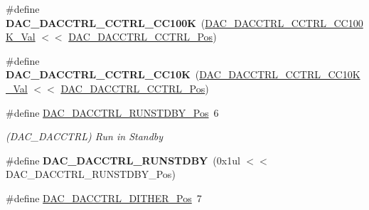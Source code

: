 \begin{DoxyCompactItemize}
\item 
\hypertarget{group___s_a_m_l21___d_a_c_gab7ebf1c9eaad10a93d17ce83471472a4}{}\#define {\bfseries D\+A\+C\+\_\+\+D\+A\+C\+C\+T\+R\+L\+\_\+\+C\+C\+T\+R\+L\+\_\+\+C\+C100\+K}~(\hyperlink{group___s_a_m_l21___d_a_c_ga64aa7d99ee21bf0fcc63c55df258a865}{D\+A\+C\+\_\+\+D\+A\+C\+C\+T\+R\+L\+\_\+\+C\+C\+T\+R\+L\+\_\+\+C\+C100\+K\+\_\+\+Val}  $<$$<$ \hyperlink{group___s_a_m_l21___d_a_c_ga99c14926d2b1e10dcdf3495435242fb2}{D\+A\+C\+\_\+\+D\+A\+C\+C\+T\+R\+L\+\_\+\+C\+C\+T\+R\+L\+\_\+\+Pos})\label{group___s_a_m_l21___d_a_c_gab7ebf1c9eaad10a93d17ce83471472a4}

\item 
\hypertarget{group___s_a_m_l21___d_a_c_gad902d7c36f9dbea0fc5b9163c98545ca}{}\#define {\bfseries D\+A\+C\+\_\+\+D\+A\+C\+C\+T\+R\+L\+\_\+\+C\+C\+T\+R\+L\+\_\+\+C\+C10\+K}~(\hyperlink{group___s_a_m_l21___d_a_c_gaa2391a15778507e58f38981575433508}{D\+A\+C\+\_\+\+D\+A\+C\+C\+T\+R\+L\+\_\+\+C\+C\+T\+R\+L\+\_\+\+C\+C10\+K\+\_\+\+Val}   $<$$<$ \hyperlink{group___s_a_m_l21___d_a_c_ga99c14926d2b1e10dcdf3495435242fb2}{D\+A\+C\+\_\+\+D\+A\+C\+C\+T\+R\+L\+\_\+\+C\+C\+T\+R\+L\+\_\+\+Pos})\label{group___s_a_m_l21___d_a_c_gad902d7c36f9dbea0fc5b9163c98545ca}

\item 
\hypertarget{group___s_a_m_l21___d_a_c_gaf3ba0076e55be71014f13602c7e9de14}{}\#define \hyperlink{group___s_a_m_l21___d_a_c_gaf3ba0076e55be71014f13602c7e9de14}{D\+A\+C\+\_\+\+D\+A\+C\+C\+T\+R\+L\+\_\+\+R\+U\+N\+S\+T\+D\+B\+Y\+\_\+\+Pos}~6\label{group___s_a_m_l21___d_a_c_gaf3ba0076e55be71014f13602c7e9de14}

\begin{DoxyCompactList}\small\item\em (D\+A\+C\+\_\+\+D\+A\+C\+C\+T\+R\+L) Run in Standby \end{DoxyCompactList}\item 
\hypertarget{group___s_a_m_l21___d_a_c_gab4a6d29fd16a3ce31665c3298e6b94fc}{}\#define {\bfseries D\+A\+C\+\_\+\+D\+A\+C\+C\+T\+R\+L\+\_\+\+R\+U\+N\+S\+T\+D\+B\+Y}~(0x1ul $<$$<$ D\+A\+C\+\_\+\+D\+A\+C\+C\+T\+R\+L\+\_\+\+R\+U\+N\+S\+T\+D\+B\+Y\+\_\+\+Pos)\label{group___s_a_m_l21___d_a_c_gab4a6d29fd16a3ce31665c3298e6b94fc}

\item 
\hypertarget{group___s_a_m_l21___d_a_c_ga8f75bd83f35ebe6cd292e79233343400}{}\#define \hyperlink{group___s_a_m_l21___d_a_c_ga8f75bd83f35ebe6cd292e79233343400}{D\+A\+C\+\_\+\+D\+A\+C\+C\+T\+R\+L\+\_\+\+D\+I\+T\+H\+E\+R\+\_\+\+Pos}~7\label{group___s_a_m_l21___d_a_c_ga8f75bd83f35ebe6cd292e79233343400}


\end{DoxyCompactItemize}
